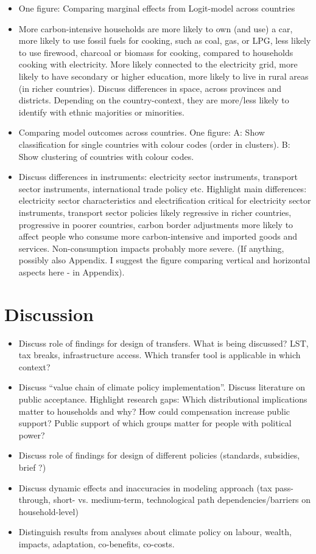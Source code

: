 \documentclass[12pt, a4paper]{article}
\begin{document}
\begin{itemize}
  \item One figure: Comparing marginal effects from Logit-model across countries
  \item More carbon-intensive households are more likely to own (and use) a car, more likely to use fossil fuels for cooking, such as coal, gas, or LPG, less likely to use firewood, charcoal or biomass for cooking, compared to households cooking with electricity. More likely connected to the electricity grid, more likely to have secondary or higher education, more likely to live in rural areas (in richer countries). Discuss differences in space, across provinces and districts. Depending on the country-context, they are more/less likely to identify with ethnic majorities or minorities.
  \item Comparing model outcomes across countries. One figure: A: Show classification for single countries with colour codes (order in clusters). B: Show clustering of countries with colour codes.
  \item Discuss differences in instruments: electricity sector instruments, transport sector instruments, international trade policy etc. Highlight main differences: electricity sector characteristics and electrification critical for electricity sector instruments, transport sector policies likely regressive in richer countries, progressive in poorer countries, carbon border adjustments more likely to affect people who consume more carbon-intensive and imported goods and services. Non-consumption impacts probably more severe. (If anything, possibly also Appendix. I suggest the figure comparing vertical and horizontal aspects here - in Appendix).
\end{itemize}

\section{Discussion} \label{sec:discussion}

\begin{itemize}
  \item Discuss role of findings for design of transfers. What is being discussed? LST, tax breaks, infrastructure access. Which transfer tool is applicable in which context?
\item Discuss ``value chain of climate policy implementation''. Discuss literature on public acceptance. Highlight research gaps: Which distributional implications matter to households and why? How could compensation increase public support? Public support of which groups matter for people with political power?
 \item Discuss role of findings for design of different policies (standards, subsidies, brief ?)
 \item Discuss dynamic effects and inaccuracies in modeling approach (tax pass-through, short- vs. medium-term, technological path dependencies/barriers on household-level)
 \item Distinguish results from analyses about climate policy on labour, wealth, impacts, adaptation, co-benefits, co-costs.
\end{itemize}
\end{document}
